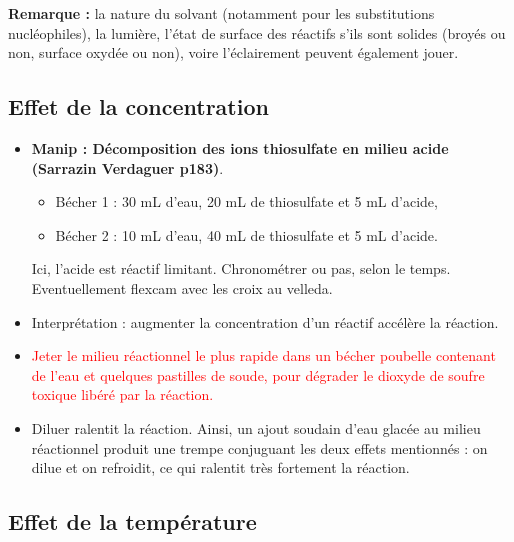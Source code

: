 \documentclass[11pt,a4paper]{report}
\begin{document}
\textbf{Remarque :} la nature du solvant (notamment pour les substitutions nucléophiles), la lumière, l'état de surface des réactifs s'ils sont solides (broyés ou non, surface oxydée ou non), voire l'éclairement peuvent également jouer.

\subsection{Effet de la concentration}

\begin{itemize}
	\item \textbf{Manip : Décomposition des ions thiosulfate en milieu acide (Sarrazin Verdaguer 		p183)}.
		\begin{itemize}
			\item Bécher 1 : 30 mL d'eau, 20 mL de thiosulfate et 5 mL d'acide,
			\item Bécher 2 : 10 mL d'eau, 40 mL de thiosulfate et 5 mL d'acide.			
		\end{itemize}	
		Ici, l'acide est réactif limitant. Chronométrer ou pas, selon le temps. Eventuellement 				flexcam avec les croix au velleda.\\	 
	
	\item Interprétation : augmenter la concentration d'un réactif accélère la réaction.
	\item \textcolor{red}{Jeter le milieu réactionnel le plus rapide dans un bécher poubelle 			contenant de l'eau et quelques pastilles de soude, pour dégrader le dioxyde de soufre toxique 		libéré par la réaction.}
	
	\item Diluer ralentit la réaction. Ainsi, un ajout soudain d'eau glacée au milieu réactionnel 		produit une trempe conjuguant les deux effets mentionnés : on dilue et on refroidit, ce qui 		ralentit très fortement la réaction. 	
\end{itemize}
\subsection{Effet de la température}
\end{document}

